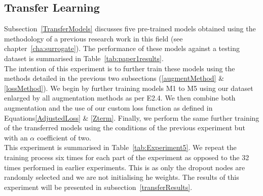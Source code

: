 \subsection{Transfer Learning} \label{transferMethod}

Subsection~\ref{TransferModels} discusses five pre-trained models obtained using the methodology of a previous research work in this field (see chapter~\ref{cha:surrogate}). The performance of these models against a testing dataset is summarised in Table~\ref{tab:paper1results}.
\\

\noindent
The intention of this experiment is to further train these models using the methods detailed in the previous two subsections (\ref{augmentMethod} \& \ref{lossMethod}). We begin by further training models M1 to M5 using our dataset enlarged by all augmentation methods as per E2.4. We then combine both augmentation and the use of our custom loss function as defined in Equations\ref{AdjustedLoss} \& \ref{Zterm}. Finally, we perform the same further training of the transferred models using the conditions of the previous experiment but with an $\alpha$ coefficient of two.
\\

\noindent
This experiment is summarised in Table~\ref{tab:Experiment5}. We repeat the training process six times for each part of the experiment as opposed to the 32 times performed in earlier experiments. This is as only the dropout nodes are randomly selected and we are not initialising he weights. The results of this experiment will be presented in subsection~\ref{transferResults}.


